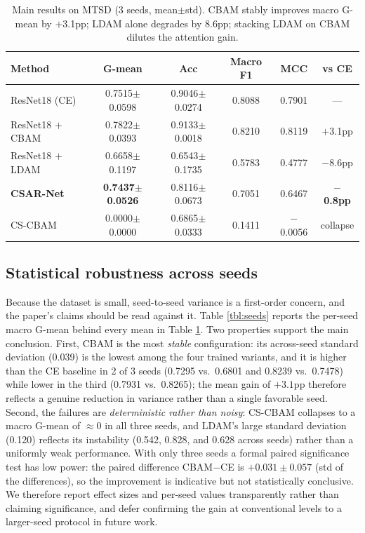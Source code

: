 \documentclass[a4paper,fleqn]{cas-sc}
\begin{document}
\begin{sloppypar}
	\begin{table}[pos=htbp]
		\footnotesize
		\caption{Main results on MTSD (3 seeds, mean$\pm$std). CBAM stably improves macro G-mean by $+$3.1pp; LDAM alone degrades by 8.6pp; stacking LDAM on CBAM dilutes the attention gain.}
		\label{tbl:main}
		\centering
		\begin{tabular}{lccccc}
	\hline
	\textbf{Method} & \textbf{G-mean} & \textbf{Acc} & \textbf{Macro F1} & \textbf{MCC} & \textbf{vs CE} \\ \hline
	ResNet18 (CE) & 0.7515$\pm$0.0598 & 0.9046$\pm$0.0274 & 0.8088 & 0.7901 & --- \\
	ResNet18 $+$ CBAM & 0.7822$\pm$0.0393 & 0.9133$\pm$0.0018 & 0.8210 & 0.8119 & $+$3.1pp \\
	ResNet18 $+$ LDAM & 0.6658$\pm$0.1197 & 0.6543$\pm$0.1735 & 0.5783 & 0.4777 & $-$8.6pp \\
	\textbf{CSAR-Net} & \textbf{0.7437$\pm$0.0526} & 0.8116$\pm$0.0673 & 0.7051 & 0.6467 & \textbf{$-$0.8pp} \\
	CS-CBAM & 0.0000$\pm$0.0000 & 0.6865$\pm$0.0333 & 0.1411 & $-$0.0056 & collapse \\
	\hline
	\end{tabular}
	\end{table}

	\subsection{Statistical robustness across seeds}
	\label{sec:stats}
	\par{
		Because the dataset is small, seed-to-seed variance is a first-order concern, and the paper's claims should be read against it. Table \ref{tbl:seeds} reports the per-seed macro G-mean behind every mean in Table \ref{tbl:main}. Two properties support the main conclusion. First, CBAM is the most \emph{stable} configuration: its across-seed standard deviation (0.039) is the lowest among the four trained variants, and it is higher than the CE baseline in 2 of 3 seeds (0.7295 vs.\ 0.6801 and 0.8239 vs.\ 0.7478) while lower in the third (0.7931 vs.\ 0.8265); the mean gain of $+3.1$pp therefore reflects a genuine reduction in variance rather than a single favorable seed. Second, the failures are \emph{deterministic rather than noisy}: CS-CBAM collapses to a macro G-mean of $\approx$0 in all three seeds, and LDAM's large standard deviation (0.120) reflects its instability (0.542, 0.828, and 0.628 across seeds) rather than a uniformly weak performance. With only three seeds a formal paired significance test has low power: the paired difference CBAM$-$CE is $+0.031\pm0.057$ (std of the differences), so the improvement is indicative but not statistically conclusive. We therefore report effect sizes and per-seed values transparently rather than claiming significance, and defer confirming the gain at conventional levels to a larger-seed protocol in future work.
	}


\end{sloppypar}
\end{document}
